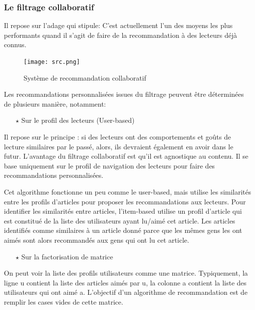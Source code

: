 	\subsubsection{Le filtrage collaboratif }
Il repose sur l’adage qui stipule:  C’est actuellement l’un des moyens les plus performants quand il s’agit de faire de la recommandation à des lecteurs déjà connus. 

	\begin{figure}[!ht]
		\centering
		\texttt{[image: src.png]} 
		\caption{Système de recommandation collaboratif}
		\label{ferme}
	\end{figure}

Les recommandations personnalisées issues du filtrage peuvent être déterminées de plusieurs manière, notamment: 
 \begin{itemize}
 	\item[$\star$] Sur le profil des lecteurs (User-based)
 \end{itemize}
 Il repose sur le principe : si des lecteurs ont des comportements et goûts de lecture similaires par le passé, alors, ils devraient également en avoir dans le futur. L’avantage du filtrage collaboratif est qu’il est agnostique au contenu. Il se base uniquement sur le profil de navigation des lecteurs pour faire des recommandations personnalisées.

 \begin{itemize}
 \end{itemize}
 Cet algorithme fonctionne un peu comme le user-based, mais utilise les similarités entre les profils d’articles pour proposer les recommandations aux lecteurs. Pour identifier les similarités entre articles, l’item-based utilise un profil d’article qui est constitué de la liste des utilisateurs ayant lu/aimé cet article. Les articles identifiés comme similaires à un article donné parce que les mêmes gens les ont aimés sont alors recommandés aux gens qui ont lu cet article. 
 \begin{itemize}
 	\item[$\star$] Sur la factorisation de matrice
 \end{itemize}
 On peut voir la liste des profils utilisateurs comme une matrice. Typiquement, la ligne u contient la liste des articles aimés par u, la colonne a contient la liste des utilisateurs qui ont aimé a. L’objectif d’un algorithme de recommandation est de remplir les cases vides de cette matrice. 
 
